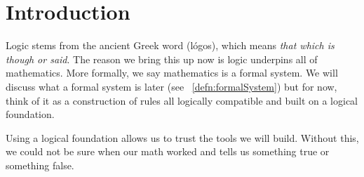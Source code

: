 \section{Introduction}

Logic stems from the ancient Greek word  (l\'{o}gos), which means \emph{that which is though or said}.
The reason we bring this up now is logic underpins all of mathematics.
More formally, we say mathematics is a formal system.
We will discuss what a formal system is later (see ~\ref{defn:formalSystem}) but for now, think of it as a construction of rules all logically compatible and built on a logical foundation.

Using a logical foundation allows us to trust the tools we will build.
Without this, we could not be sure when our math worked and tells us something true or something false.










